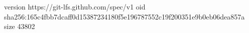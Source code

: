 version https://git-lfs.github.com/spec/v1
oid sha256:165c4fbb7dcaff0d15387234180f5e196787552c19f200351e9b0eb06dea857a
size 43802
